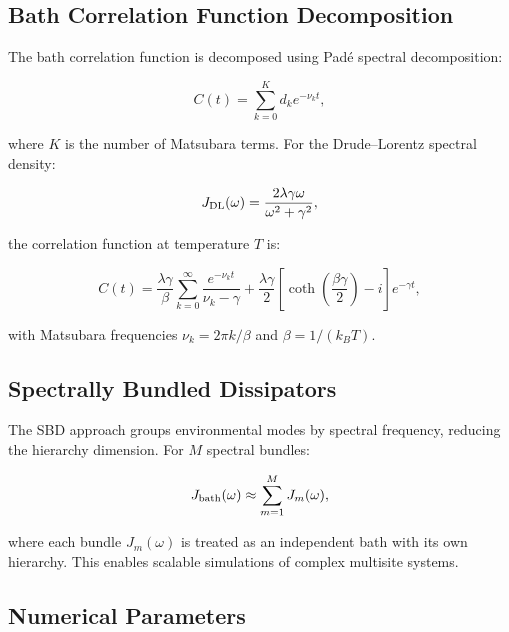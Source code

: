 \documentclass[11pt,a4paper]{article}
\begin{document}
\subsection{Bath Correlation Function Decomposition}

The bath correlation function is decomposed using Padé spectral decomposition:

\begin{equation}
C(t) = \sum_{k=0}^{K} d_k e^{-\nu_k t},
\label{eq:SI_bath_correlation}
\end{equation}

where $K$ is the number of Matsubara terms. For the Drude--Lorentz spectral density:

\begin{equation}
J_{\rm DL}(\omega) = \frac{2\lambda\gamma\omega}{\omega^2 + \gamma^2},
\label{eq:SI_drude_lorentz}
\end{equation}

the correlation function at temperature $T$ is:

\begin{equation}
C(t) = \frac{\lambda\gamma}{\beta}\sum_{k=0}^{\infty} \frac{e^{-\nu_k t}}{\nu_k - \gamma} + \frac{\lambda\gamma}{2}\left[\coth\left(\frac{\beta\gamma}{2}\right) - i\right]e^{-\gamma t},
\label{eq:SI_correlation_DL}
\end{equation}

with Matsubara frequencies $\nu_k = 2\pi k/\beta$ and $\beta = 1/(k_B T)$.

\subsection{Spectrally Bundled Dissipators}

The SBD approach groups environmental modes by spectral frequency, reducing the hierarchy dimension. For $M$ spectral bundles:

\begin{equation}
J_{\rm bath}(\omega) \approx \sum_{m=1}^{M} J_m(\omega),
\label{eq:SI_sbd}
\end{equation}

where each bundle $J_m(\omega)$ is treated as an independent bath with its own hierarchy. This enables scalable simulations of complex multisite systems.

\subsection{Numerical Parameters}
\end{document}
